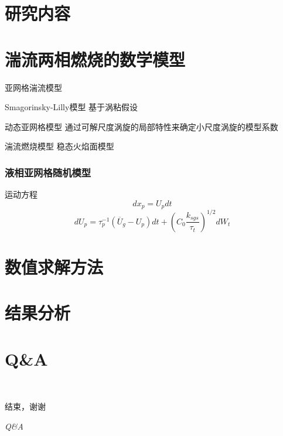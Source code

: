 \documentclass[compress,8pt,t]{beamer}
\begin{document}
\section{研究内容}
\section{湍流两相燃烧的数学模型}
\begin{frame}{亚网格湍流模型}
  \begin{alertblock}{Smagorinsky-Lilly模型}
    基于涡粘假设
  \end{alertblock}
  \begin{exampleblock}{动态亚网格模型}
    通过可解尺度涡旋的局部特性来确定小尺度涡旋的模型系数
  \end{exampleblock}
\end{frame}
\begin{frame}{湍流燃烧模型}
稳态火焰面模型
\end{frame}
\begin{frame}
  \frametitle{液相亚网格随机模型}
  \begin{block}{运动方程}
    $$dx_p=U_pdt$$
  \[dU_p=\tau_p^{-1}( {\overline U}_g-U_p)dt+(C_0\frac{k_{sgs}}{\tau_t})^{1/2}dW_t\]
  \end{block}
\end{frame}
\section{数值求解方法}
\section{结果分析}
\section{Q\&A}
\begin{frame}{\secname~ }
  \begin{center}
    \huge {\kaishu 结束，谢谢}

    \huge \textit {Q\&A}
  \end{center}
\end{frame}
\end{document}
